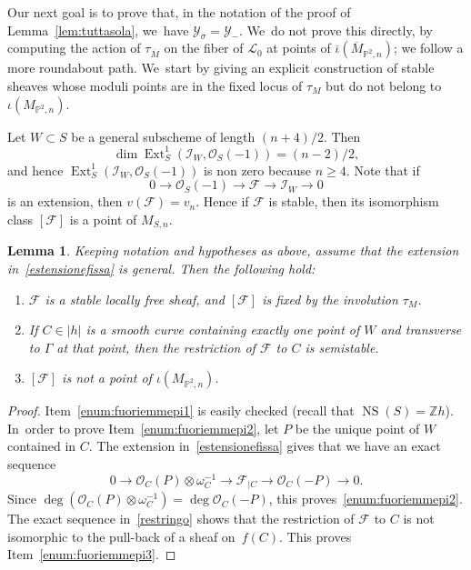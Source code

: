 \documentclass[JEP,XML,SOM,Unicode,published]{cedram}
\newenvironment{enumeratea}
{\bgroup\def\theenumi{\alph{enumi}}\begin{enumerate}}
{\end{enumerate}\egroup}
\newcommand{\PP}{{\mathbb P}}\let\P\PP
\newcommand{\ZZ}{{\mathbb Z}}\let\Z\ZZ
\newcommand\cF{\mathcal{F}}
\newcommand\cI{\mathcal{I}}
\newcommand\cL{\mathcal{L}}
\newcommand\cO{\mathcal{O}}
\newcommand\cY{\mathcal{Y}}
\DeclareMathOperator{\Ext}{Ext}
\DeclareMathOperator{\NS}{NS}
\let\ov\overline
\newtheorem{lemm}{Lemma}[section]
\theoremstyle{definition}
\begin{document}
Our next goal is to prove that, in the notation of the proof of Lemma~\ref{lem:tuttasola}, we~have $\cY_{\sigma}=\cY_{-}$. We~do not prove this directly, \ie by computing the action of $\tau_{\ov{M}}$ on the fiber of $\cL_0$ at points of $\ov{\iota}(\ov{M}_{\PP^2,n})$; we follow a more roundabout path. We~start by giving an explicit construction of stable sheaves whose moduli points are in the fixed locus of $\tau_M$ but do not belong to $\iota(M_{\PP^2,n})$.

Let $W\subset S$ be a general subscheme of length $(n+4)/2$. Then
\begin{equation*}\label{dimext}
\dim\Ext^1_S(\cI_W,\cO_S(-1))=(n-2)/2,
\end{equation*}
and hence
$\Ext^1_S(\cI_W,\cO_S(-1))$ is non zero because $n\ge 4$. Note that if
\begin{equation}\label{estensionefissa}
0\to \cO_S(-1)\to \cF\to \cI_W\to 0
\end{equation}
is an extension, then $v(\cF)=v_n$.
Hence if $\cF$ is stable, then its isomorphism class $[\cF]$ is a point of $M_{S,n}$.

\begin{lemm}\label{lem:fuoriemmepi}
Keeping notation and hypotheses as above, assume that the extension in~\eqref{estensionefissa} is general.
Then the following hold:
\begin{enumeratea}
\item\label{enum:fuoriemmepi1} $\cF$ is a stable locally free sheaf, and $[\cF]$ is fixed by the involution $\tau_{M}$.
\item\label{enum:fuoriemmepi2} If $C\in|h|$ is a smooth curve containing exactly one point of $W$ and transverse to $\mathsf{\Gamma}$ at that point, then the restriction of $\cF$ to $C$ is semistable.
\item\label{enum:fuoriemmepi3} $[\cF]$ is not a point of $\iota(M_{\PP^2,n})$.
\end{enumeratea}
\end{lemm}

\begin{proof}
Item~\eqref{enum:fuoriemmepi1} is easily checked (recall that $\NS(S)=\ZZ h$). In~order to prove Item~\eqref{enum:fuoriemmepi2}, let $P$ be the unique point of $W$ contained in $C$.
The extension in~\eqref{estensionefissa} gives that we have an exact sequence
\begin{equation}\label{restringo}
0\to \cO_C(P)\otimes\omega^{-1}_C\to \cF_{|C}\to \cO_C(-P)\to 0.
\end{equation}
Since $\deg(\cO_C(P)\otimes\omega^{-1}_C)=\deg\cO_C(-P)$, this proves~\eqref{enum:fuoriemmepi2}.
The exact sequence in~\eqref{restringo} shows that the restriction of $\cF$ to $C$ is not isomorphic to the pull-back of a sheaf on~$f(C)$. This proves Item~\eqref{enum:fuoriemmepi3}.
\end{proof}
\end{document}
